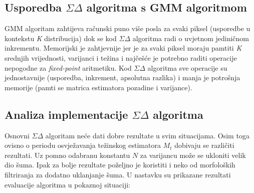 \documentclass[a4paper,twocolumn]{article}
\begin{document}
\subsection{Usporedba \(\Sigma\Delta\) algoritma s GMM algoritmom}
GMM algoritam zahtijeva računski puno više posla za svaki piksel (usporedbe
u kontekstu \textit{K} distribucija) dok se kod \(\Sigma\Delta\) algoritma radi
o uvjetnom jediničnom inkrementu. Memorijski je zahtjevnije jer je za svaki
piksel moraju pamtiti \textit{K} srednjih vrijednosti, varijanci i težina i
najčešće je potrebno raditi operacije nepogodne za \textit{fixed-point}
aritmetiku. Kod \(\Sigma\Delta\) algoritma sve operacije su jednostavnije
(usporedba, inkrement, apsolutna razlika) i manja je potrošnja memorije
(pamti se matrica estimatora pozadine i varijance).

\subsection{Analiza implementacije \(\Sigma\Delta\) algoritma}
Osnovni \(\Sigma\Delta\) algoritam neće dati dobre rezultate u svim situacijama.
Osim toga ovisno o periodu osvježavanja težinskog estimatora \(M_t\) dobivaju
se različiti rezultati. Uz pomno odabranu konstantu \(N\) za varijancu može
se ukloniti velik dio šuma. Ipak za bolje rezultate poželjno je koristiti i
neko od morfoloških filtriranja za dodatno uklanjanje šuma. U nastavku su
prikazane rezultati evaluacije algoritma u pokaznoj situaciji:
\end{document}
